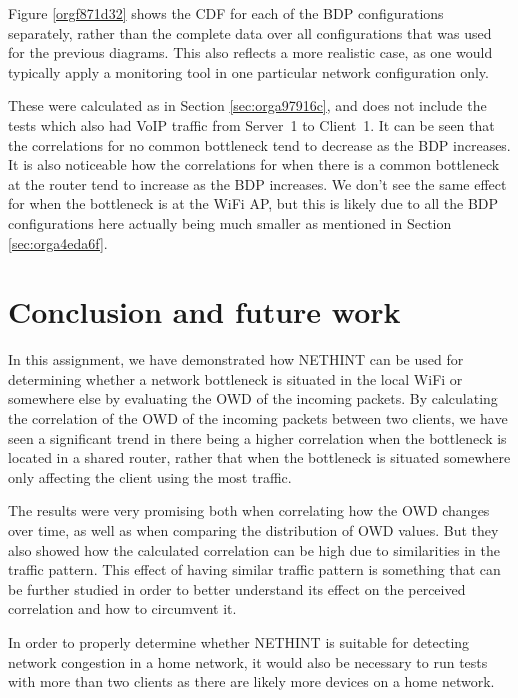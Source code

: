 \documentclass[a4paper,11pt]{article}
\begin{document}
Figure \ref{orgf871d32} shows the CDF for each of the BDP configurations separately, rather than the complete data over all configurations that was used for the previous diagrams. This also reflects a more realistic case, as one would typically apply a monitoring tool in one particular network configuration only.

These were calculated as in Section \ref{sec:orga97916c}, and does not include the tests which also had VoIP traffic from Server~1 to Client~1. It can be seen that the correlations for no common bottleneck tend to decrease as the BDP increases. It is also noticeable how the correlations for when there is a common bottleneck at the router tend to increase as the BDP increases. We don't see the same effect for when the bottleneck is at the WiFi AP, but this is likely due to all the BDP configurations here actually being much smaller as mentioned in Section \ref{sec:orga4eda6f}.
\section{Conclusion and future work}
\label{sec:orga4637f0}
In this assignment, we have demonstrated how NETHINT can be used for determining whether a network bottleneck is situated in the local WiFi or somewhere else by evaluating the OWD of the incoming packets. By calculating the correlation of the OWD of the incoming packets between two clients, we have seen a significant trend in there being a higher correlation when the bottleneck is located in a shared router, rather that when the bottleneck is situated somewhere only affecting the client using the most traffic.

The results were very promising both when correlating how the OWD changes over time, as well as when comparing the distribution of OWD values. But they also showed how the calculated correlation can be high due to similarities in the traffic pattern. This effect of having similar traffic pattern is something that can be further studied in order to better understand its effect on the perceived correlation and how to circumvent it.

In order to properly determine whether NETHINT is suitable for detecting network congestion in a home network, it would also be necessary to run tests with more than two clients as there are likely more devices on a home network.
\end{document}
